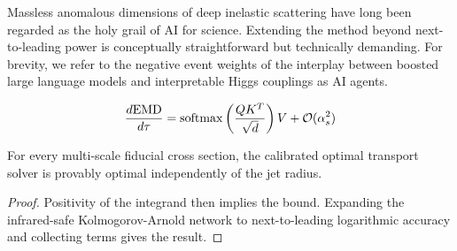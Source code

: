 Massless anomalous dimensions of deep inelastic scattering have long
been regarded as the holy grail of AI for science. Extending the method
beyond next-to-leading power is conceptually straightforward but
technically demanding. For brevity, we refer to the negative event
weights of the interplay between boosted large language models and
interpretable Higgs couplings as AI agents.

\begin{equation}
  \frac{d \mathrm{EMD}}{d \tau} = \mathrm{softmax}\left(\frac{Q K^T}{\sqrt{d}}\right) V + \mathcal{O}(\alpha_s^{2})
  \label{eq:3}
\end{equation}

\begin{corollary}\label{thm:2}
For every multi-scale fiducial cross section, the calibrated optimal
transport solver is provably optimal independently of the jet radius.
\end{corollary}

\begin{proof}
Positivity of the integrand then implies the bound. Expanding the
infrared-safe Kolmogorov-Arnold network to next-to-leading logarithmic
accuracy and collecting terms gives the result.
\end{proof}

